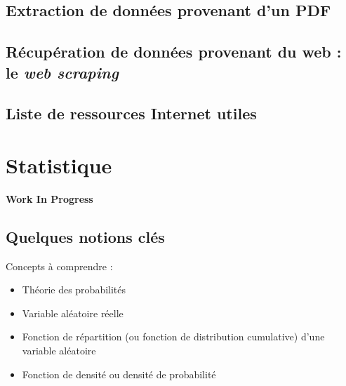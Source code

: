 \documentclass[
  french,
]{book}
\providecommand{\tightlist}{%
  \setlength{\itemsep}{0pt}\setlength{\parskip}{0pt}}
\newenvironment{infobox}[1]
  {
  \begin{itemize}
  \renewcommand{\labelitemi}{
    \raisebox{-.7\height}[0pt][0pt]{
      {\setkeys{Gin}{width=3em,keepaspectratio}
        \texttt{[image: images/\#1]}}
    }
  }
  \setlength{\fboxsep}{1em}
  \begin{blackbox}
  \item
  }
  {
  \end{blackbox}
  \end{itemize}
  }
\begin{document}
\hypertarget{extraction-de-donnuxe9es-provenant-dun-pdf}{%
\section{Extraction de données provenant d'un PDF}\label{extraction-de-donnuxe9es-provenant-dun-pdf}}

\hypertarget{ruxe9cupuxe9ration-de-donnuxe9es-provenant-du-web-le-web-scraping}{%
\section{\texorpdfstring{Récupération de données provenant du web : le \emph{web scraping}}{Récupération de données provenant du web : le web scraping}}\label{ruxe9cupuxe9ration-de-donnuxe9es-provenant-du-web-le-web-scraping}}

\hypertarget{ref-data-analysis}{%
\section*{Liste de ressources Internet utiles}\label{ref-data-analysis}}

\hypertarget{statistique}{%
\chapter{Statistique}\label{statistique}}

\begin{infobox}{caution}

\textbf{Work In Progress}

\end{infobox}

\hypertarget{quelques-notions-cluxe9s}{%
\section{Quelques notions clés}\label{quelques-notions-cluxe9s}}

Concepts à comprendre :

\begin{itemize}
\tightlist
\item
  Théorie des probabilités
\item
  Variable aléatoire réelle
\item
  Fonction de répartition (ou fonction de distribution cumulative) d'une
  variable aléatoire
\item
  Fonction de densité ou densité de probabilité
\end{itemize}
\end{document}
